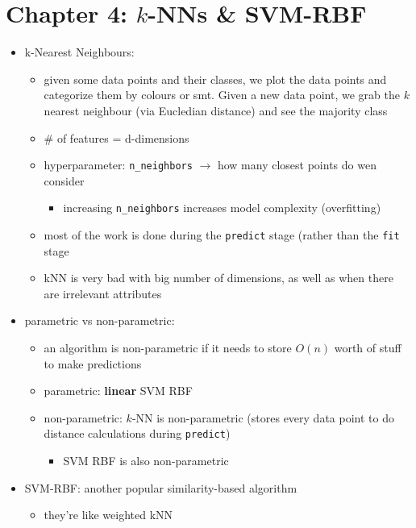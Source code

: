 \documentclass[10.5pt,a4paper, fleqn, dvipsnames]{article}
\makeatletter
\newcommand*{\sectionbookmark}[1][]{%
  \bookmark[%
    level=section,%
    dest=\@currentHref,%
    #1%
  ]%
}
\makeatother
\begin{document}
\section*{Chapter 4: $k$-NNs \& SVM-RBF}
\sectionbookmark{Chapter 4: $k$-NNs \& SVM-RBF}
\begin{itemize}
    \item k-Nearest Neighbours: 
    \begin{itemize}
        \item given some data points and their classes, we plot the data points and categorize them by colours or smt. Given a new data point, we grab the $k$ nearest neighbour (via Eucledian distance) and see the majority class
        \item \# of features = d-dimensions
        \item hyperparameter: \lstinline!n_neighbors! $\rightarrow$ how many closest points do wen consider
        \begin{itemize}[leftmargin = 2em]
            \item increasing \lstinline!n_neighbors! increases model complexity (overfitting)
        \end{itemize}
        \item most of the work is done during the \lstinline!predict! stage (rather than the \lstinline!fit! stage
        \item kNN is very bad with big number of dimensions, as well as when there are irrelevant attributes
    \end{itemize}
    \item parametric vs non-parametric:
    \begin{itemize}
        \item an algorithm is non-parametric if it needs to store $O(n)$ worth of stuff to make predictions
        \item parametric: \textbf{linear} SVM RBF
        \item non-parametric: $k$-NN is non-parametric (stores every data point to do distance calculations during \lstinline!predict!) 
        \begin{itemize}[leftmargin=2em]
            \item SVM RBF is also non-parametric
        \end{itemize}
    \end{itemize}
    \item SVM-RBF: another popular similarity-based algorithm 
    \begin{itemize}
        \item they're like weighted kNN

\end{itemize}
\end{itemize}
\end{document}
